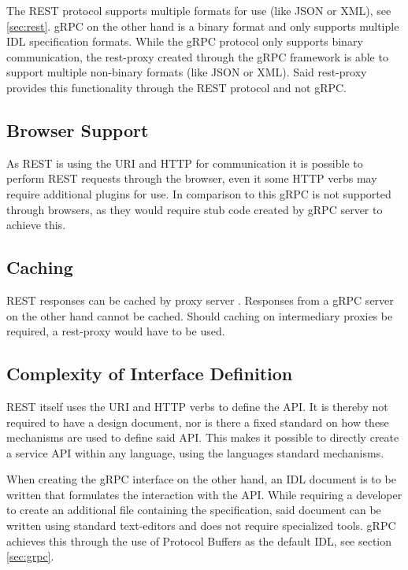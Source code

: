 \documentclass[conference]{IEEEtran}
\begin{document}
The REST protocol supports multiple formats for use (like JSON or XML), see \ref{sec:rest}. gRPC on the other hand is a binary format and only supports multiple IDL specification formats. While the gRPC protocol only supports binary communication, the rest-proxy created through the gRPC framework is able to support multiple non-binary formats (like JSON or XML). Said rest-proxy provides this functionality through the REST protocol and not gRPC.

\subsection{Browser Support}

As REST is using the URI and HTTP for communication it is possible to perform REST requests through the browser, even it some HTTP verbs may require additional plugins for use. In comparison to this gRPC is not supported through browsers, as they would require stub code created by gRPC server to achieve this.

\subsection{Caching}

REST responses can be cached by proxy server \cite{wagh2012comparative}. Responses from a gRPC server on the other hand cannot be cached. Should caching on intermediary proxies be required, a rest-proxy would have to be used.

\subsection{Complexity of Interface Definition}

REST itself uses the URI and HTTP verbs to define the API. It is thereby not required to have a design document, nor is there a fixed standard on how these mechanisms are used to define said API. This makes it possible to directly create a service API within any language, using the languages standard mechanisms.

When creating the gRPC interface on the other hand, an IDL document is to be written that formulates the interaction with the API. While requiring a developer to create an additional file containing the specification, said document can be written using standard text-editors and does not require specialized tools. gRPC achieves this through the use of Protocol Buffers as the default IDL, see section \ref{sec:grpc}.
\end{document}
